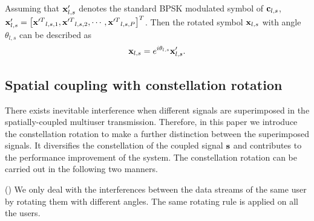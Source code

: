 \documentclass[conference]{IEEEtran}
\begin{document}
Assuming that ${\bf{x}}{'_{l,s}}$ denotes the standard BPSK modulated symbol of ${{\bf{c}}_{l,s}}$, ${\bf{x}}{'_{l,s}} = {\left[ {{\bf{x}}{'^T}_{l,s,1},{\bf{x}}{'^T}_{l,s,2}, \cdots ,{\bf{x}}{'^T}_{l,s,P}} \right]^T}$. Then the rotated symbol ${{\bf{x}}_{l,s}}$ with angle ${{\theta} _{l,s}}$ can be described as
\begin{equation}
{{\bf{x}}_{l,s}} = {e^{i{{\theta} _{l,s}}}}{\bf{x}}{'_{l,s}}\label{4}.
\end {equation}

\subsection{Spatial coupling with constellation rotation}
 There exists inevitable interference when different signals are superimposed in the spatially-coupled multiuser transmission. Therefore, in this paper we introduce the constellation rotation to make a further distinction between the superimposed signals. It diversifies the constellation of the coupled signal ${\bf{s}}$ and contributes to the performance improvement of the system. The constellation rotation can be carried out in the following two manners.

(\uppercase\expandafter{}) We only deal with the interferences between the data streams of the same user by rotating them with different angles. The same rotating rule is applied on all the users.
\end{document}
